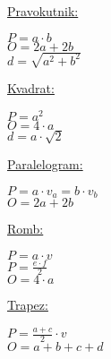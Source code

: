 \documentclass[9pt,oneside,a4paper]{report}
\title{}
\begin{document}
\begin{center}
\end{center}

\noindent
\begin{minipage}[t]{55mm}
	\underline{Pravokutnik:}

	\vspace{2mm}

	\noindent
	$\displaystyle P=a\cdot b$\\
	$\displaystyle O=2a+2b$\\
	$\displaystyle d=\sqrt{a^2+b^2}$
\end{minipage}
\begin{minipage}[t]{55mm}
	\underline{Kvadrat:}

	\vspace{2mm}

	\noindent
	$\displaystyle P=a^2$\\
	$\displaystyle O=4\cdot a$\\
	$\displaystyle d=a\cdot \sqrt 2$
\end{minipage}
\begin{minipage}[t]{55mm}
	\underline{Paralelogram:}

	\vspace{2mm}

	\noindent
	$\displaystyle P=a\cdot v_a=b\cdot v_b$\\
	$\displaystyle O=2a+2b$\\
\end{minipage}

\vspace{3mm}
\noindent
\begin{minipage}[t]{42mm}
	\underline{Romb:}

	\vspace{2mm}
\end{minipage}
\begin{minipage}[t]{30mm}
	\vspace{5mm}
	$\displaystyle P=a\cdot v$\\
	$\displaystyle P=\frac{e\cdot f}2$\\
	$\displaystyle O=4\cdot a$
\end{minipage}
\begin{minipage}[t]{39mm}
	\underline{Trapez:}

	\noindent
\end{minipage}
\begin{minipage}[t]{24mm}
	\vspace{5mm}
	$\displaystyle P=\frac{a+c}2\cdot v$\\
	$\displaystyle O=a+b+c+d$
\end{minipage}
\end{document}

